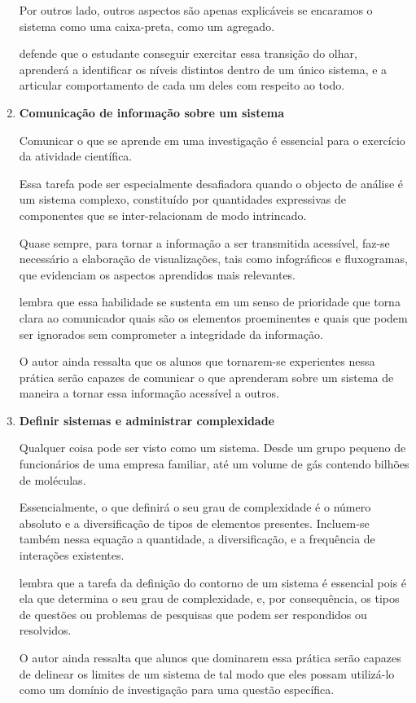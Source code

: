 \begin{enumerate}
  Por outros lado, outros aspectos são apenas explicáveis se encaramos o sistema como uma caixa-preta, como um agregado.

   defende que o estudante conseguir exercitar essa transição do olhar, aprenderá a identificar os níveis distintos dentro de um único sistema, e a articular comportamento de cada um deles com respeito ao todo.


  \item \textbf{Comunicação de informação sobre um sistema}

  Comunicar o que se aprende em uma investigação é essencial para o exercício da atividade científica.

  Essa tarefa pode ser especialmente desafiadora quando o objecto de análise é um sistema complexo, constituído por quantidades expressivas de componentes que se inter-relacionam de modo intrincado.

  Quase sempre, para tornar a informação a ser transmitida acessível, faz-se necessário a elaboração de visualizações, tais como infográficos e fluxogramas, que evidenciam os aspectos aprendidos mais relevantes. 

   lembra que essa habilidade se sustenta em um senso de prioridade que torna clara ao comunicador quais são os elementos proeminentes e quais que podem ser ignorados sem comprometer a integridade da informação.

  O autor ainda ressalta que os alunos que tornarem-se experientes nessa prática serão capazes de comunicar o que aprenderam sobre um sistema de maneira a tornar essa informação acessível a outros. 


  \item \textbf{Definir sistemas e administrar complexidade}

  Qualquer coisa pode ser visto como um sistema. Desde um grupo pequeno de funcionários de uma empresa familiar, até um volume de gás contendo bilhões de moléculas.

  Essencialmente, o que definirá o seu grau de complexidade é o número absoluto e a diversificação de tipos de elementos presentes. Incluem-se também nessa equação a quantidade, a diversificação, e a frequência de interações existentes.

   lembra que a tarefa da definição do contorno de um sistema é essencial pois é ela que determina o seu grau de complexidade, e, por consequência, os tipos de questões ou problemas de pesquisas que podem ser respondidos ou resolvidos.

  O autor ainda ressalta que alunos que dominarem essa prática serão capazes de delinear os limites de um sistema de tal modo que eles possam utilizá-lo como um domínio de investigação para uma questão específica. 
\end{enumerate}

